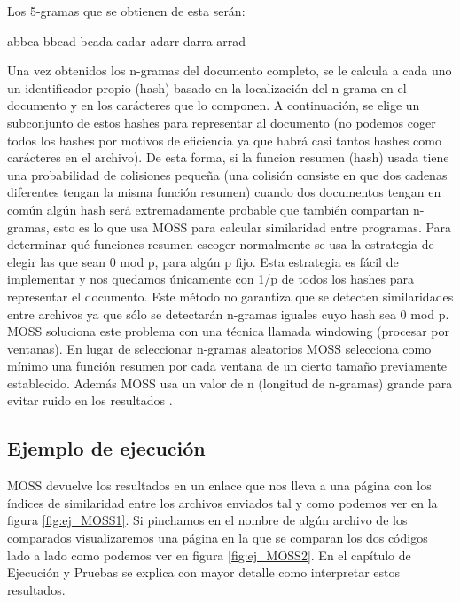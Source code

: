 Los 5-gramas que se obtienen de esta serán:

\begin{center}
abbca  bbcad  bcada  cadar  adarr  darra  arrad
\end{center}

Una vez obtenidos los n-gramas del documento completo, se le calcula a cada uno un identificador propio (hash) basado en la localización del n-grama en el documento y en los carácteres que lo componen.
\newline
A continuación, se elige un subconjunto de estos hashes para representar al documento (no podemos coger todos los hashes por motivos de eficiencia ya que habrá casi tantos hashes como carácteres en el archivo).
\newline
De esta forma, si la funcion resumen (hash) usada tiene una probabilidad de colisiones pequeña (una colisión consiste en que dos cadenas diferentes tengan la misma función resumen) cuando dos documentos tengan en común algún hash será extremadamente probable que también compartan n-gramas, esto es lo que usa MOSS para calcular similaridad entre programas.
\newline
Para determinar qué funciones resumen escoger normalmente se usa la estrategia de elegir las que sean 0 mod p, para algún p fijo. Esta estrategia es fácil de implementar y nos quedamos únicamente con 1/p de todos los hashes para representar el documento.
\newline
Este método no garantiza que se detecten similaridades entre archivos ya que sólo se detectarán n-gramas iguales cuyo hash sea 0 mod p.
\newline
MOSS soluciona este problema con una técnica llamada windowing (procesar por ventanas).
\newline
En lugar de seleccionar n-gramas aleatorios MOSS selecciona como mínimo una función resumen por cada ventana de un cierto tamaño previamente establecido. Además MOSS usa un valor de n (longitud de n-gramas) grande para evitar ruido en los resultados \cite{Moss_Jplag_info}.

\subsection{Ejemplo de ejecución}
MOSS devuelve los resultados en un enlace que nos lleva a una página con los índices de similaridad entre los archivos enviados tal y como podemos ver en la figura \ref{fig:ej_MOSS1}.
\newline
Si pinchamos en el nombre de algún archivo de los comparados visualizaremos una página en la que se comparan los dos códigos lado a lado como podemos ver en figura \ref{fig:ej_MOSS2}.
En el capítulo de Ejecución y Pruebas se explica con mayor detalle como interpretar estos resultados.

